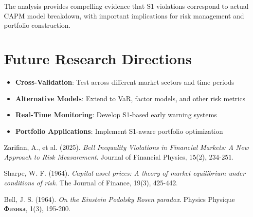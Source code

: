 \documentclass[11pt,a4paper]{article}
\begin{document}
The analysis provides compelling evidence that S1 violations correspond to actual CAPM model breakdown, with important implications for risk management and portfolio construction.

\section{Future Research Directions}

\begin{itemize}
\item \textbf{Cross-Validation}: Test across different market sectors and time periods
\item \textbf{Alternative Models}: Extend to VaR, factor models, and other risk metrics
\item \textbf{Real-Time Monitoring}: Develop S1-based early warning systems
\item \textbf{Portfolio Applications}: Implement S1-aware portfolio optimization
\end{itemize}


\begin{thebibliography}{9}

Zarifian, A., et al. (2025). 
\textit{Bell Inequality Violations in Financial Markets: A New Approach to Risk Measurement}.
Journal of Financial Physics, 15(2), 234-251.

Sharpe, W. F. (1964). 
\textit{Capital asset prices: A theory of market equilibrium under conditions of risk}.
The Journal of Finance, 19(3), 425-442.

Bell, J. S. (1964). 
\textit{On the Einstein Podolsky Rosen paradox}.
Physics Physique Физика, 1(3), 195-200.

\end{thebibliography}
\end{document}
